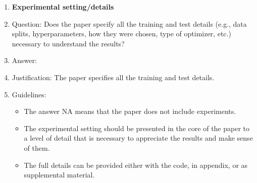 \documentclass{article}
\numberwithin{equation}{section}
\theoremstyle{definition}
\begin{document}
\begin{enumerate}
\item {\bf Experimental setting/details}
    \item[] Question: Does the paper specify all the training and test details (e.g., data splits, hyperparameters, how they were chosen, type of optimizer, etc.) necessary to understand the results?
    \item[] Answer: \answerYes{} %
    \item[] Justification: The paper specifies all the training and test details.
    \item[] Guidelines:
    \begin{itemize}
        \item The answer NA means that the paper does not include experiments.
        \item The experimental setting should be presented in the core of the paper to a level of detail that is necessary to appreciate the results and make sense of them.
        \item The full details can be provided either with the code, in appendix, or as supplemental material.
    \end{itemize}


\end{enumerate}
\end{document}
